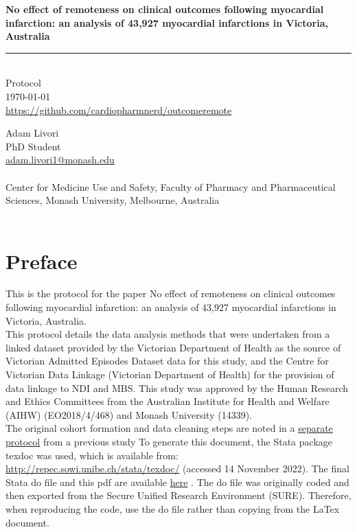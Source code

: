 \documentclass[11pt]{article}
\newcommand{\thedate}{\today}
\begin{document}
\begin{titlepage}
  \begin{flushright}
        \Huge
        \textbf{No effect of remoteness on clinical outcomes following myocardial infarction: an analysis of 43,927 myocardial infarctions in Victoria, Australia}
\color{violet}
\rule{16cm}{2mm} \\
\Large
\color{black}
Protocol \\
\thedate \\
\color{blue}
\url{https://github.com/cardiopharmnerd/outcomeremote} \\
\color{black}
       \vfill
    \end{flushright}
        \Large

\noindent
Adam Livori \\
PhD Student \\
\color{blue}
\href{mailto:adam.livori1@Monash.edu}{adam.livori1@monash.edu} \\ 
\color{black}
\\
Center for Medicine Use and Safety, Faculty of Pharmacy and Pharmaceutical Sciences, Monash University, Melbourne, Australia \\
\\
\end{titlepage}

\pagebreak
\tableofcontents
\pagebreak

\pagebreak
\section{Preface}

This is the protocol for the paper No effect of remoteness on clinical outcomes following myocardial infarction: an analysis of 43,927 myocardial infarctions in Victoria, Australia. \\
This protocol details the data analysis methods that were undertaken from a linked dataset provided by the Victorian Department of Health as the source of Victorian Admitted Episodes Dataset data for this study, and the Centre for Victorian Data Linkage (Victorian Department of Health) for the provision of data linkage to NDI and MBS. This study was approved by the Human Research and Ethics Committees from the Australian Institute for Health and Welfare (AIHW) (EO2018/4/468) and Monash University (14339). \\
The original cohort formation and data cleaning steps are noted in a \color{blue} \href{https://github.com/cardiopharmnerd/medsremote}{separate protocol} from a previous study \color{black}
To generate this document, the Stata package texdoc was used, which is available from: \color{blue} \url{http://repec.sowi.unibe.ch/stata/texdoc/} \color{black} (accessed 14 November 2022). The final Stata do file and this pdf are available \color{blue} \href{https://github.com/jimb0w/BA}{here} \color{black}. The do file was originally coded and then exported from the Secure Unified Research Environment (SURE). Therefore, when reproducing the code, use the do file rather than copying from the LaTex document. 
\end{document}
